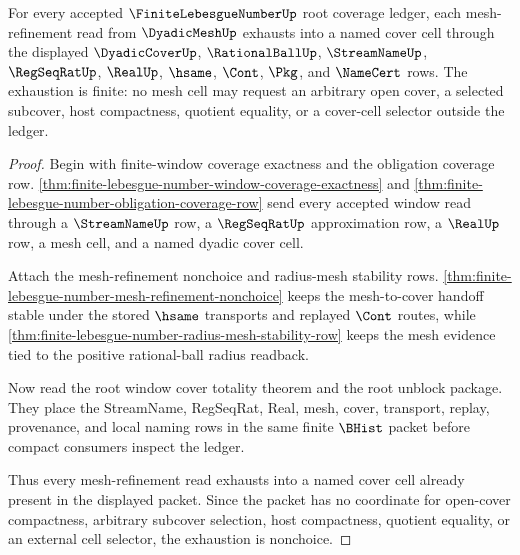 \begin{theorem}
\label{thm:finite-lebesgue-number-mesh-refinement-cover-exhaustion}
For every accepted $\FiniteLebesgueNumberUp$ root coverage ledger, each mesh-refinement read from $\DyadicMeshUp$ exhausts into a named cover cell through the displayed $\DyadicCoverUp$, $\RationalBallUp$, $\StreamNameUp$, $\RegSeqRatUp$, $\RealUp$, $\hsame$, $\Cont$, $\Pkg$, and $\NameCert$ rows. The exhaustion is finite: no mesh cell may request an arbitrary open cover, a selected subcover, host compactness, quotient equality, or a cover-cell selector outside the ledger.
\end{theorem}
\begin{proof}
Begin with finite-window coverage exactness and the obligation coverage row. \autoref{thm:finite-lebesgue-number-window-coverage-exactness} and \autoref{thm:finite-lebesgue-number-obligation-coverage-row} send every accepted window read through a $\StreamNameUp$ row, a $\RegSeqRatUp$ approximation row, a $\RealUp$ row, a mesh cell, and a named dyadic cover cell.

Attach the mesh-refinement nonchoice and radius-mesh stability rows. \autoref{thm:finite-lebesgue-number-mesh-refinement-nonchoice} keeps the mesh-to-cover handoff stable under the stored $\hsame$ transports and replayed $\Cont$ routes, while \autoref{thm:finite-lebesgue-number-radius-mesh-stability-row} keeps the mesh evidence tied to the positive rational-ball radius readback.

Now read the root window cover totality theorem and the root unblock package. They place the StreamName, RegSeqRat, Real, mesh, cover, transport, replay, provenance, and local naming rows in the same finite $\BHist$ packet before compact consumers inspect the ledger.

Thus every mesh-refinement read exhausts into a named cover cell already present in the displayed packet. Since the packet has no coordinate for open-cover compactness, arbitrary subcover selection, host compactness, quotient equality, or an external cell selector, the exhaustion is nonchoice.
\end{proof}

